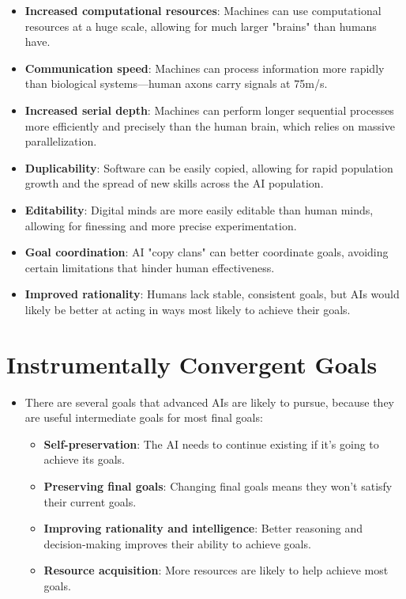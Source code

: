\documentclass{article}
\begin{document}
\begin{multicols}{2}
\begin{itemize}
    \item \textbf{Increased computational resources}: Machines can use computational resources at a huge scale, allowing for much larger "brains" than humans have.
    \item \textbf{Communication speed}: Machines can process information more rapidly than biological systems—human axons carry signals at 75m/s.
    \item \textbf{Increased serial depth}: Machines can perform longer sequential processes more efficiently and precisely than the human brain, which relies on massive parallelization.
    \item \textbf{Duplicability}: Software can be easily copied, allowing for rapid population growth and the spread of new skills across the AI population.
    \item \textbf{Editability}: Digital minds are more easily editable than human minds, allowing for finessing and more precise experimentation.
    \item \textbf{Goal coordination}: AI "copy clans" can better coordinate goals, avoiding certain limitations that hinder human effectiveness.
    \item \textbf{Improved rationality}: Humans lack stable, consistent goals, but AIs would likely be better at acting in ways most likely to achieve their goals.
\end{itemize}

\section{Instrumentally Convergent Goals}
\begin{itemize}
    \item There are several goals that advanced AIs are likely to pursue, because they are useful intermediate goals for most final goals:
    \begin{itemize}
        \item \textbf{Self-preservation}: The AI needs to continue existing if it's going to achieve its goals.
        \item \textbf{Preserving final goals}: Changing final goals means they won't satisfy their current goals.
        \item \textbf{Improving rationality and intelligence}: Better reasoning and decision-making improves their ability to achieve goals.
        \item \textbf{Resource acquisition}: More resources are likely to help achieve most goals.
    \end{itemize}
\end{itemize}


\end{multicols}
\end{document}
